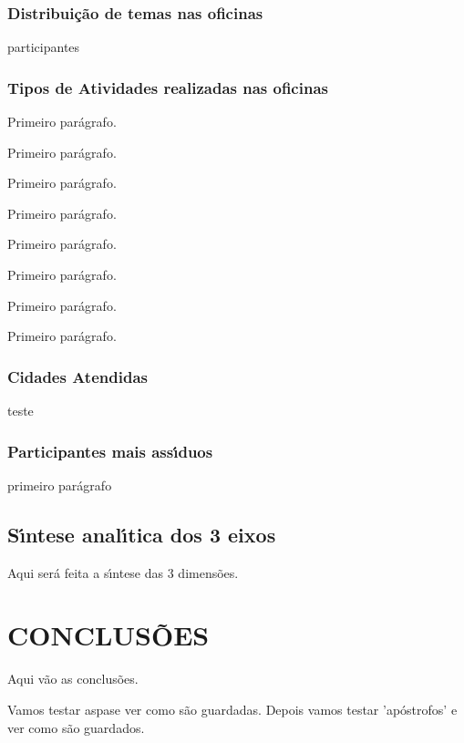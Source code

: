 \documentclass[
12pt,		%
openright,	%
twoside,  %
a4paper,			%
chapter=TITLE,		%
english,			%
french,				%
spanish,			%
brazil				%
]{USPSC-classe/USPSC}
\begin{document}
\subsection[Distribui\c{c}\~ao de temas nas oficinas]{Distribui\c{c}\~ao de temas nas oficinas}\label{Distribui\c{c}\~ao de temas nas oficinas}
participantes


\subsection[Tipos de Atividades realizadas nas oficinas]{Tipos de Atividades realizadas nas oficinas}\label{Tipos de Atividades realizadas nas oficinas}
Primeiro par\'agrafo.


Primeiro par\'agrafo.


Primeiro par\'agrafo.


Primeiro par\'agrafo.


Primeiro par\'agrafo.


Primeiro par\'agrafo.


Primeiro par\'agrafo.


Primeiro par\'agrafo.


\subsection[Cidades Atendidas]{Cidades Atendidas}\label{Cidades Atendidas}
teste


\subsection[Participantes mais ass\'{\i}duos]{Participantes mais ass\'{\i}duos}\label{Participantes mais ass\'{\i}duos}
primeiro par\'agrafo


\section[S\'{\i}ntese anal\'{\i}tica dos 3 eixos]{S\'{\i}ntese anal\'{\i}tica dos 3 eixos}\label{S\'{\i}ntese anal\'{\i}tica dos 3 eixos}
Aqui ser\'a feita a s\'{\i}ntese das 3 dimens\~oes.


\chapter[CONCLUS\~OES]{CONCLUS\~OES}\label{CONCLUS\~OES}
Aqui v\~ao as conclus\~oes.


Vamos testar \textquotedbl aspas\textquotedbl  e ver como s\~ao guardadas. Depois vamos testar 'ap\'ostrofos' e ver como s\~ao guardados.
\end{document}

